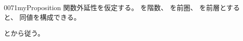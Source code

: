 \documentclass[index]{subfiles}
\begin{document}
\begin{myBlock}{0071}{myProposition}
  関数外延性を仮定する。
  を階数、
  を前圏、
  を前層とすると、
  同値を構成できる。
\end{myBlock}
\begin{myProof}
  とから従う。
\end{myProof}
\end{document}
